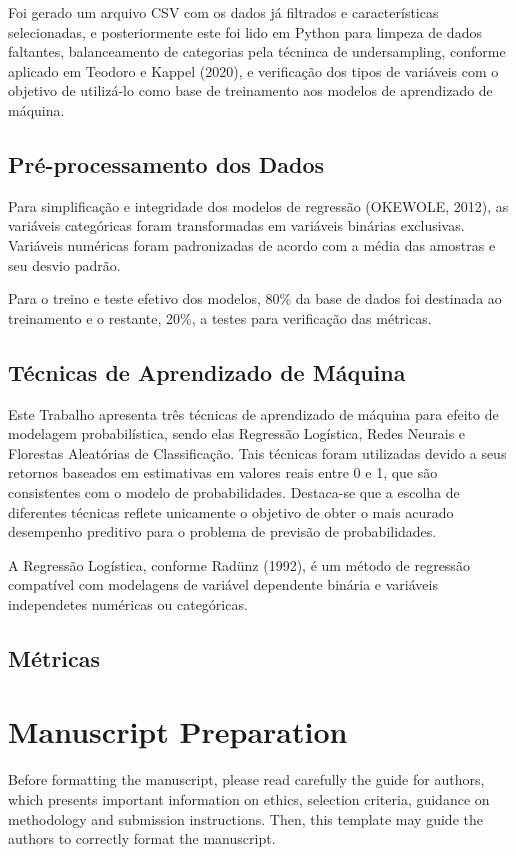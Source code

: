 \documentclass[english, spanish, brazilian]{RBIEarticle} %
\begin{document}
Foi gerado um arquivo CSV com os dados já filtrados e características selecionadas, e posteriormente este foi lido em Python para limpeza de dados faltantes, balanceamento de categorias pela técninca de undersampling, conforme aplicado em Teodoro e Kappel (2020), e verificação dos tipos de variáveis com o objetivo de utilizá-lo como base de treinamento aos modelos de aprendizado de máquina.


\subsection{Pré-processamento dos Dados}
Para simplificação e integridade dos modelos de regressão (OKEWOLE, 2012), as variáveis categóricas foram transformadas em variáveis binárias exclusivas. Variáveis numéricas foram padronizadas de acordo com a média das amostras e seu desvio padrão.

Para o treino e teste efetivo dos modelos, 80\% da base de dados foi destinada ao treinamento e o restante, 20\%, a testes para verificação das métricas. 

\subsection{Técnicas de Aprendizado de Máquina}
Este Trabalho apresenta três técnicas de aprendizado de máquina para efeito de modelagem probabilística, sendo elas Regressão Logística, Redes Neurais e Florestas Aleatórias de Classificação. Tais técnicas foram utilizadas devido a seus retornos baseados em estimativas em valores reais entre 0 e 1, que são consistentes com o modelo de probabilidades. Destaca-se que a escolha de diferentes técnicas reflete unicamente o objetivo de obter o mais acurado desempenho preditivo para o problema de previsão de probabilidades.

A Regressão Logística, conforme Radünz (1992), é um método de regressão compatível com modelagens de variável dependente binária e variáveis independetes numéricas ou categóricas. 

\subsection{Métricas}


\section{Manuscript Preparation}
Before formatting the manuscript, please read carefully the guide for authors, which presents important information on ethics, selection criteria, guidance on methodology and submission instructions. Then, this template may guide the authors to correctly format the manuscript.
\end{document}
